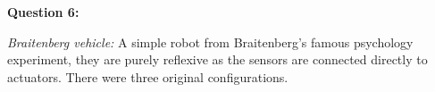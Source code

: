 \textbf{Question 6:}


\emph{Braitenberg vehicle:}
A simple robot from Braitenberg's famous psychology experiment, they are purely reflexive as the sensors are connected directly to actuators. There were three original configurations.

